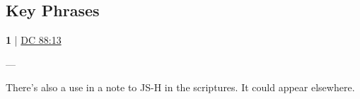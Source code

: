 		
		
\subsection{Key Phrases} %
	\label{BOSOM-PHRASES}

	\begin{compactdesc}
	
		\item[bosom of eternity] \textbf{1} | \hyperref[DC88-13]{DC 88:13}
			\begin{compactdesc}
				\item[Bible anchor verses] ---
				\item[Commentary] There's also a use in a note to JS-H in the scriptures. It could appear elsewhere.
			\end{compactdesc}
			
	\end{compactdesc}
	


	
		
